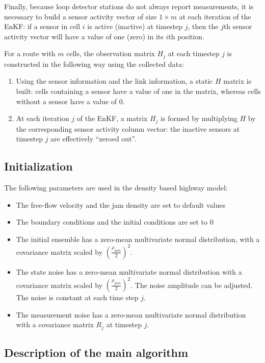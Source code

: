 \documentclass[letterpaper,10pt]{article}
\begin{document}
Finally, because loop detector stations do not always report
measurements, it is necessary to build a sensor activity vector of
size $1 \times m$ at each iteration of the EnKF: if a sensor in cell
$i$ is active (inactive) at timestep $j$, then the $j$th sensor activity vector will have a value of one (zero) in its $i$th position.

For a route with $m$ cells, the observation matrix $H_j$ at each
timestep $j$ is constructed in the following way using the collected
data:
\begin{enumerate}
  \item Using the sensor information and the link information, a
    static $H$ matrix is built: cells containing a sensor have a value
    of one in the matrix, whereas cells without a sensor have a value
    of 0.
  \item At each iteration $j$ of the EnKF, a matrix $H_j$ is formed by
    multiplying $H$ by the corresponding sensor activity column
    vector: the inactive sensors at timestep $j$ are effectively
    ``zeroed out''.
\end{enumerate}

\subsection{Initialization}
The following parameters are used in the density based highway model:
\begin{itemize}
  \item The free-flow velocity and the jam density are set to default values
  \item The boundary conditions and the initial conditions are set to $0$
  \item The initial ensemble has a zero-mean multivariate normal distribution, with a covariance matrix scaled by $(\frac{\rho_{jam}}{2})^{2}$. 
  \item The state noise has a zero-mean multivariate normal distribution with a covariance matrix scaled by $(\frac{\rho_{jam}}{2})^{2}$. The noise amplitude can be adjusted. The noise is constant at each time step $j$.
  \item The measurement noise has a zero-mean multivariate normal distribution with a covariance matrix $R_j$ at timestep $j$.
\end{itemize}

\subsection{Description of the main algorithm}
\end{document}
